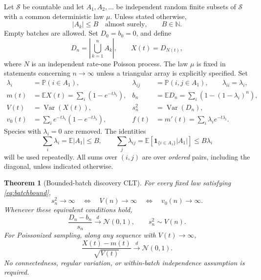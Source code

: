 \documentclass[11pt]{article}
\numberwithin{equation}{section}
\newtheorem{theorem}{Theorem}[section]
\theoremstyle{definition}
\theoremstyle{remark}
\newcommand{\E}{\mathbb E}
\newcommand{\Pp}{\mathbb P}
\newcommand{\N}{\mathbb N}
\newcommand{\ind}{\mathbf 1}
\newcommand{\Var}{\operatorname{Var}}
\newcommand{\Normal}{\mathcal N(0,1)}
\newcommand{\dto}{\xrightarrow{\ d\ }}
\begin{document}
Let $\mathcal S$ be countable and let $A_1,A_2,\ldots$ be independent random
finite subsets of $\mathcal S$ with a common deterministic law $\mu$. Unless
stated otherwise,
\begin{equation}\label{eq:batchbound}
 |A_k|\le B\quad\text{almost surely},\qquad B\in\N.
\end{equation}
Empty batches are allowed. Set $D_0=b_0=0$, and define
\[
 D_n=\left|\bigcup_{k=1}^n A_k\right|,\qquad
 X(t)=D_{N(t)},
\]
where $N$ is an independent rate-one Poisson process. The law $\mu$ is fixed in
statements concerning $n\to\infty$ unless a triangular array is explicitly
specified. Set
\begin{align}
 \lambda_i&=\Pp(i\in A_1),&
 \lambda_{ij}&=\Pp(i,j\in A_1),\qquad \lambda_{ii}=\lambda_i,\label{eq:rates}\\
 m(t)&=\E X(t)=\sum_i(1-e^{-t\lambda_i}),&
 b_n&=\E D_n=\sum_i(1-(1-\lambda_i)^n),\label{eq:means}\\
 V(t)&=\Var(X(t)),&s_n^2&=\Var(D_n),\label{eq:vars}\\
 v_0(t)&=\sum_i e^{-t\lambda_i}(1-e^{-t\lambda_i}),&
 f(t)&=m'(t)=\sum_i\lambda_i e^{-t\lambda_i}.\label{eq:flux}
\end{align}
Species with $\lambda_i=0$ are removed. The identities
\begin{equation}\label{eq:rows}
 \sum_i\lambda_i=\E|A_1|\le B,\qquad
 \sum_j\lambda_{ij}=\E[\ind_{\{i\in A_1\}}|A_1|]\le B\lambda_i
\end{equation}
will be used repeatedly. All sums over $(i,j)$ are over \emph{ordered} pairs,
including the diagonal, unless indicated otherwise.

\begin{theorem}[Bounded-batch discovery CLT]\label{thm:main}
For every fixed law satisfying \eqref{eq:batchbound},
\[
 s_n^2\longrightarrow\infty
 \quad\Longleftrightarrow\quad V(n)\longrightarrow\infty
 \quad\Longleftrightarrow\quad v_0(n)\longrightarrow\infty.
\]
Whenever these equivalent conditions hold,
\begin{equation}\label{eq:fixedCLT}
 \frac{D_n-b_n}{s_n}\dto\Normal,
 \qquad s_n^2\sim V(n).
\end{equation}
For Poissonized sampling, along any sequence with $V(t)\to\infty$,
\begin{equation}\label{eq:poisCLT}
 \frac{X(t)-m(t)}{\sqrt{V(t)}}\dto\Normal.
\end{equation}
No connectedness, regular variation, or within-batch independence assumption is
required.
\end{theorem}
\end{document}
